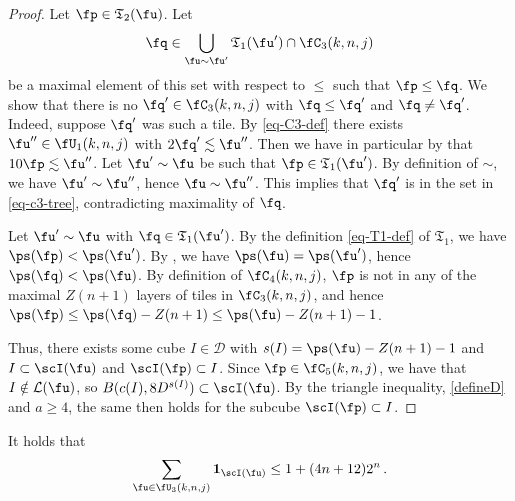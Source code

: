 \begin{proof}
    Let $\fp \in \mathfrak{T}_2(\fu)$. Let
    \begin{equation}
        \label{eq-c3-tree}
        \fq \in \bigcup_{\fu \sim \fu'} \mathfrak{T}_1(\fu') \cap \fC_3(k,n,j)
    \end{equation}
    be a maximal element of this set with respect to $\le$ such that $\fp \le \fq$.
    We show that there is no $\fq' \in \fC_3(k,n,j)$ with $\fq \le \fq'$ and $\fq \ne \fq'$. Indeed, suppose $\fq'$ was such a tile.
    By \eqref{eq-C3-def} there exists $\fu'' \in \fU_1(k,n,j)$ with $2\fq' \lesssim \fu''$. Then we have in particular by  that $10 \fp \lesssim \fu''$. Let $\fu' \sim \fu$ be such that $\fp \in \mathfrak{T}_1(\fu')$. By definition of $\sim$, we have $\fu' \sim \fu''$, hence $\fu \sim \fu''$. This implies that $\fq'$ is in the set in \eqref{eq-c3-tree}, contradicting maximality of $\fq$.

    Let $\fu' \sim \fu$ with $\fq \in \mathfrak{T}_1(\fu')$. By the definition \eqref{eq-T1-def} of $\mathfrak{T}_1$, we have $\ps(\fp) < \ps(\fu')$. By , we have $\ps(\fu) = \ps(\fu')$, hence $\ps(\fq) < \ps(\fu)$. By definition of $\fC_4(k,n,j)$, $\fp$ is not in any of the maximal $Z(n+1)$ layers of tiles in $\fC_3(k,n,j)$, and hence $\ps(\fp) \le \ps(\fq) - Z(n+1) \le \ps(\fu) - Z(n+1) - 1$.

    Thus, there exists some cube $I \in \mathcal{D}$ with $s(I) = \ps(\fu) - Z(n+1) - 1$ and $I \subset \scI(\fu)$ and $\scI(\fp) \subset I$. Since $\fp \in \fC_5(k,n,j)$, we have that $I \notin \mathcal{L}(\fu)$, so $B(c(I), 8D^{s(I)}) \subset \scI(\fu)$. By the triangle inequality, \eqref{defineD} and $a \ge 4$, the same then holds for the subcube $\scI(\fp) \subset I$.
\end{proof}


\begin{lemma}
    \label{forest-stacking}
    It holds that
    \begin{equation}
        \sum_{\fu \in \fU_3(k,n,j)} \mathbf{1}_{\scI(\fu)} \le 1 + (4n+12)2^{n}\,.
    \end{equation}
\end{lemma}

